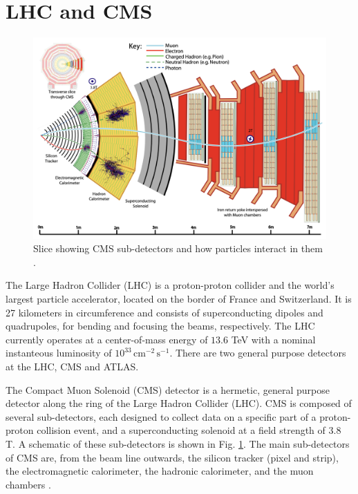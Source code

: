 \documentclass[12pt]{article}
\begin{document}
\section{LHC and CMS}
\begin{figure}
    \centering
    \includegraphics[width=0.75\linewidth]{figures/CMSslice_whiteBackground.png}
    \caption{Slice showing CMS sub-detectors and how particles interact in them \cite{particle_flow_2017}.}
    \label{fig:cms-subdetectors}
\end{figure}

The Large Hadron Collider (LHC) is a proton-proton collider and the world's largest particle accelerator, located on the border of France and Switzerland. It is 27 kilometers in circumference and consists of superconducting dipoles and quadrupoles, for bending and focusing the beams, respectively. The LHC currently operates at a center-of-mass energy of $13.6$ TeV with a nominal instanteous luminosity of $10^{33}\, \text{cm}^{-2}\, \text{s}^{-1}$. There are two general purpose detectors at the LHC, CMS and ATLAS.\par

The Compact Muon Solenoid (CMS) detector is a hermetic, general purpose detector along the ring of the Large Hadron Collider (LHC). CMS is composed of several sub-detectors, each designed to collect data on a specific part of a proton-proton collision event, and a superconducting solenoid at a field strength of $3.8$ T. A schematic of these sub-detectors is shown in Fig. \ref{fig:cms-subdetectors}. The main sub-detectors of CMS are, from the beam line outwards, the silicon tracker (pixel and strip), the electromagnetic calorimeter, the hadronic calorimeter, and the muon chambers \cite{CMS_Collaboration_2008}.\par
\end{document}
